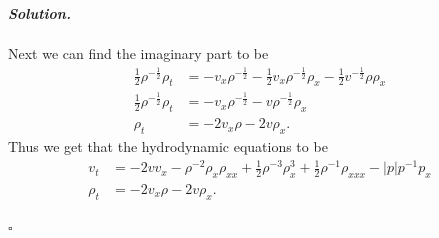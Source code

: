 \documentclass[12pt]{report}
\newenvironment{solution}[1][\it{Solution}]{\textbf{#1. } }{$\square$}
\newcommand{\abs}[1]{{\left|#1\right|}} %
\begin{document}
\begin{solution}
\begin{enumerate}
\begin{align*}
        \end{align*}
        Next we can find the imaginary part to be
        \begin{align*}
            \frac{1}{2}\rho^{-\frac{1}{2}}\rho_t &= -v_x\rho^{-\frac{1}{2}} - \frac{1}{2}v_x \rho^{-\frac{1}{2}}\rho_x - \frac{1}{2}v^{-\frac{1}{2}}\rho\rho_x\\
            \frac{1}{2}\rho^{-\frac{1}{2}}\rho_t &= -v_x \rho^{-\frac{1}{2}} - v\rho^{-\frac{1}{2}}\rho_x\\
            \rho_t &= -2v_x\rho - 2v\rho_x.
        \end{align*}
        Thus we get that the hydrodynamic equations to be
        \begin{align*}
            v_t &= -2vv_x - \rho^{-2}\rho_x\rho_{xx} + \frac{1}{2}\rho^{-3}\rho_x^3 + \frac{1}{2}\rho^{-1}\rho_{xxx}-\abs{p}p^{-1}p_x\\
            \rho_t &= -2v_x\rho - 2v\rho_x.
        \end{align*}


\end{enumerate}
\end{solution}
\end{document}
